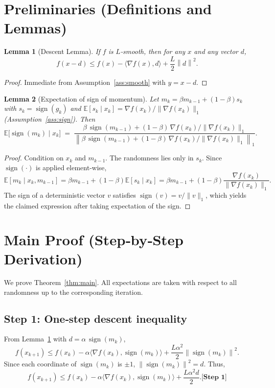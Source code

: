 \documentclass{article}
\newtheorem{lemma}{Lemma}
\newcommand{\E}{\mathbb{E}}
\newcommand{\norm}[1]{\left\lVert #1\right\rVert}
\newcommand{\sgn}{\operatorname{sign}}
\newcommand{\step}[1]{\textbf{[Step #1]}}
\begin{document}
\section*{Preliminaries (Definitions and Lemmas)}
\begin{lemma}[Descent Lemma]\label{lem:smooth-descent}
If $f$ is $L$‑smooth, then for any $x$ and any vector $d$,
\[
f(x-d)\le f(x)-\langle\nabla f(x),d\rangle+\frac{L}{2}\norm{d}^{2}.
\]
\end{lemma}
\begin{proof}
Immediate from Assumption~\ref{ass:smooth} with $y=x-d$.
\end{proof}

\begin{lemma}[Expectation of sign of momentum]\label{lem:sign-mom}
Let $m_{k}=\beta m_{k-1}+(1-\beta)s_{k}$ with $s_{k}=\sgn(g_{k})$ and
$\E[s_{k}\mid x_{k}]=\nabla f(x_{k})/\|\nabla f(x_{k})\|_{1}$ (Assumption~\ref{ass:sign}).
Then
\[
\E\!\bigl[\sgn(m_{k})\mid x_{k}\bigr]
\;=\;
\frac{\beta\,\sgn(m_{k-1})+(1-\beta)\,\nabla f(x_{k})/\|\nabla f(x_{k})\|_{1}}
{\norm{\beta\,\sgn(m_{k-1})+(1-\beta)\,\nabla f(x_{k})/\|\nabla f(x_{k})\|_{1}}_{1}} .
\]
\end{lemma}
\begin{proof}
Condition on $x_{k}$ and $m_{k-1}$.  The randomness lies only in $s_{k}$.
Since $\sgn(\cdot)$ is applied element‑wise,
\[
\E[m_{k}\mid x_{k},m_{k-1}]
   =\beta m_{k-1}+(1-\beta)\E[s_{k}\mid x_{k}]
   =\beta m_{k-1}+(1-\beta)\frac{\nabla f(x_{k})}{\|\nabla f(x_{k})\|_{1}} .
\]
The sign of a deterministic vector $v$ satisfies $\sgn(v)=v/\|v\|_{1}$,
which yields the claimed expression after taking expectation of the sign.
\end{proof}

\section*{Main Proof (Step‑by‑Step Derivation)}
We prove Theorem~\ref{thm:main}.  
All expectations are taken with respect to all randomness up to the
corresponding iteration.

\subsection*{Step 1: One‑step descent inequality}
From Lemma~\ref{lem:smooth-descent} with $d=\alpha\,\sgn(m_{k})$,
\[
f(x_{k+1})
\le f(x_{k})-\alpha\langle\nabla f(x_{k}),\sgn(m_{k})\rangle
      +\frac{L\alpha^{2}}{2}\norm{\sgn(m_{k})}^{2}.
\tag{2}
\]
Since each coordinate of $\sgn(m_{k})$ is $\pm1$, $\norm{\sgn(m_{k})}^{2}=d$.
Thus,
\[
f(x_{k+1})
\le f(x_{k})-\alpha\langle\nabla f(x_{k}),\sgn(m_{k})\rangle
      +\frac{L\alpha^{2}d}{2}.
\step{1}
\]
\end{document}

